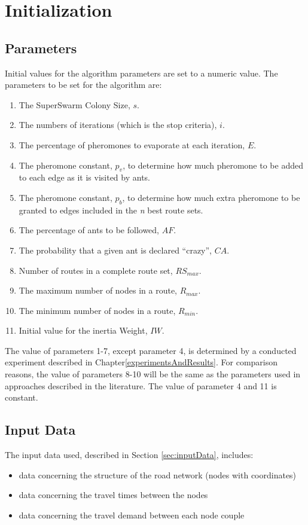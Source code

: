 \section{Initialization}
\label{sec:algoInitialization}
\subsection{Parameters}
Initial values for the algorithm parameters are set to a numeric value. The parameters to be set for the algorithm are:
\begin{enumerate}
\item The SuperSwarm Colony Size, $s$. 
\item The numbers of iterations (which is the stop criteria), $i$.
\item The percentage of pheromones to evaporate at each iteration, $E$.
\item The pheromone constant, $p_v$, to determine how much pheromone to be added to each edge as it is visited by ants.
\item The pheromone constant, $p_b$, to determine how much extra pheromone to be granted to edges included in the \textit{n} best route sets.
\item The percentage of ants to be followed, $AF$.
\item The probability that a given ant is declared ``crazy'', $CA$.
\item Number of routes in a complete route set, $RS_{max}$. 
\item The maximum number of nodes in a route, $R_{max}$.
\item The minimum number of nodes in a route, $R_{min}$.
\item Initial value for the inertia Weight, $IW$.
\end{enumerate}
The value of parameters 1-7, except parameter 4, is determined by a conducted experiment described in Chapter\vref{experimentsAndResults}. For comparison reasons, the value of parameters 8-10 will be the same as the parameters used in approaches described in the literature\citep{mandl79, kechagiopoulos14, nikolic14,kidwai98,fan10,chakroborty02,zhang10,chew12,baaj91}. The value of parameter 4 and 11 is constant. 

\subsection{Input Data}
The input data used, described in Section \vref{sec:inputData}, includes:
\begin{itemize}
\item data concerning the structure of the road network (nodes with coordinates)
\item data concerning the travel times between the nodes 
\item data concerning the travel demand between each node couple
\end{itemize}

